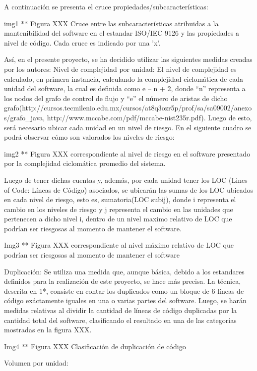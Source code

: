 A continuación se presenta el cruce propiedades/subcaracterísticas:

img1 ** Figura XXX Cruce entre las subcaracterísticas atribuidas a la mantenibilidad del software en el estandar ISO/IEC 9126 y las propiedades a nivel de código. Cada cruce es indicado por una 'x'.

Así, en el presente proyecto, se ha decidido utilizar las siguientes medidas creadas por los autores:
Nivel de complejidad por unidad: El nivel de complejidad es calculado, en primera instancia, calculando la complejidad ciclomática de cada unidad del software, la cual es definida como e – n + 2, donde “n” representa a los nodos del grafo de control de flujo y “e” el número de aristas de dicho grafo(http://cursos.tecmilenio.edu.mx/cursos/at8q3ozr5p/prof/sa/sa09002/anexos/grafo_java, http://www.mccabe.com/pdf/mccabe-nist235r.pdf). Luego de esto, será necesario ubicar cada unidad en un nivel de riesgo. En el siguiente cuadro se podrá observar cómo son valorados los niveles de riesgo:

img2 ** Figura XXX correspondiente al nivel de riesgo en el software presentado por la complejidad ciclomática promedio del sistema. 

Luego de tener dichas cuentas y, además, por cada unidad tener los LOC (Lines of Code: Líneas de Código) asociados, se ubicarán las sumas de los LOC ubicados en cada nivel de riesgo, esto es, sumatoria(LOC subij), donde i representa el cambio en los niveles de riesgo y j representa el cambio en las unidades que pertenecen a dicho nivel i, dentro de un nivel maximo relativo de LOC que podrían ser riesgosas al momento de mantener el software.

Img3 ** Figura XXX correspondiente al nivel máximo relativo de LOC que podrían ser riesgosas al momento de mantener el software


Duplicación: Se utiliza una medida que, aunque básica, debido a los estandares definidos para la realización de este proyecto, se hace más precisa. La técnica, descrita en 1*, consiste en contar los duplicados como un bloque de 6 líneas de código exáctamente iguales en una o varias partes del software. Luego, se harán medidas relativas al dividir la cantidad de líneas de código duplicadas por la cantidad total del software, clasificando el resultado en una de las categorías mostradas en la figura XXX.

Img4 ** Figura XXX Clasificación de duplicación de código

Volumen por unidad: 

